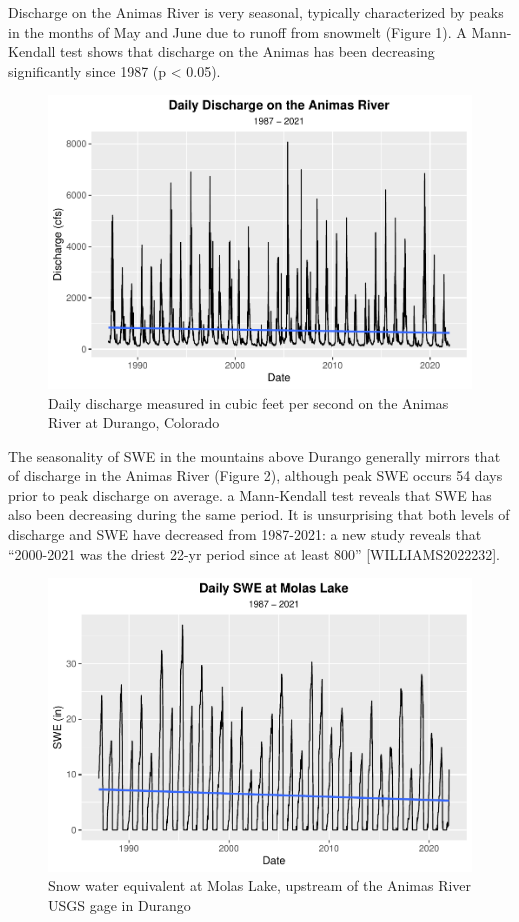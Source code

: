 \documentclass[
  12pt,
]{article}
\begin{document}
Discharge on the Animas River is very seasonal, typically characterized
by peaks in the months of May and June due to runoff from snowmelt
(Figure 1). A Mann-Kendall test shows that discharge on the Animas has
been decreasing significantly since 1987 (p \textless{} 0.05).

\begin{figure}
\centering
\includegraphics{Final_Report_files/figure-latex/unnamed-chunk-1-1.pdf}
\caption{Daily discharge measured in cubic feet per second on the Animas
River at Durango, Colorado}
\end{figure}

The seasonality of SWE in the mountains above Durango generally mirrors
that of discharge in the Animas River (Figure 2), although peak SWE
occurs 54 days prior to peak discharge on average. a Mann-Kendall test
reveals that SWE has also been decreasing during the same period. It is
unsurprising that both levels of discharge and SWE have decreased from
1987-2021: a new study reveals that ``2000-2021 was the driest 22-yr
period since at least 800'' {[}WILLIAMS2022232{]}.

\begin{figure}
\centering
\includegraphics{Final_Report_files/figure-latex/unnamed-chunk-2-1.pdf}
\caption{Snow water equivalent at Molas Lake, upstream of the Animas
River USGS gage in Durango}
\end{figure}
\end{document}
